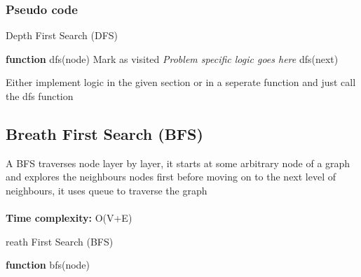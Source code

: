 \documentclass[12pt]{extarticle}
\begin{document}
\subsubsection*{Pseudo code}

\begin{algorithm} [H]
    \caption{Depth First Search (DFS)}
    \begin{algorithmic}[1]
        \STATE \textbf{function} dfs(node)
        \RETURN
        \ENDIF
        \STATE Mark as visited
        \STATE \textit{Problem specific logic goes here}
        \STATE dfs(next)
        \ENDFOR
    \end{algorithmic}
\end{algorithm}

Either implement logic in the given section or in a seperate function and just call 
the dfs function

\subsection{Breath First Search (BFS)}
A BFS traverses node layer by layer, it starts at some arbitrary node of a graph and explores the neighbours nodes first before moving on to the next level of neighbours, it uses queue to traverse the graph
\\ \\  
\textbf{Time complexity:} O(V+E)

\begin{algorithm}
    \caption Breath First Search (BFS)
    \begin{algorithmic}
        \STATE \textbf{function} bfs(node)
    \end{algorithmic}
\end{algorithm}
\end{document}
